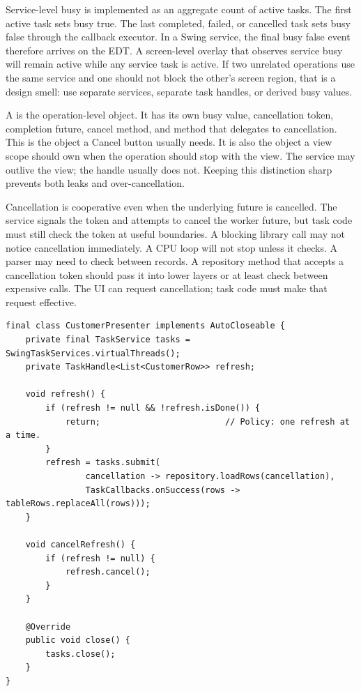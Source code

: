 Service-level busy is implemented as an aggregate count of active tasks. The
first active task sets busy true. The last completed, failed, or cancelled task
sets busy false through the callback executor. In a Swing service, the final
busy false event therefore arrives on the EDT. A screen-level overlay that
observes service busy will remain active while any service task is active. If
two unrelated operations use the same service and one should not block the
other's screen region, that is a design smell: use separate services, separate
task handles, or derived busy values.

A  is the operation-level object. It has its own busy value,
cancellation token, completion future, cancel method, and  method
that delegates to cancellation. This is the object a Cancel button usually
needs. It is also the object a view scope should own when the operation should
stop with the view. The service may outlive the view; the handle usually does
not. Keeping this distinction sharp prevents both leaks and over-cancellation.

Cancellation is cooperative even when the underlying future is cancelled. The
service signals the token and attempts to cancel the worker future, but task
code must still check the token at useful boundaries. A blocking library call
may not notice cancellation immediately. A CPU loop will not stop unless it
checks. A parser may need to check between records. A repository method that
accepts a cancellation token should pass it into lower layers or at least check
between expensive calls. The UI can request cancellation; task code must make
that request effective.

\begin{lstlisting}[caption={A task service registered with a view lifecycle.}]
final class CustomerPresenter implements AutoCloseable {
    private final TaskService tasks = SwingTaskServices.virtualThreads();
    private TaskHandle<List<CustomerRow>> refresh;

    void refresh() {
        if (refresh != null && !refresh.isDone()) {
            return;                         // Policy: one refresh at a time.
        }
        refresh = tasks.submit(
                cancellation -> repository.loadRows(cancellation),
                TaskCallbacks.onSuccess(rows -> tableRows.replaceAll(rows)));
    }

    void cancelRefresh() {
        if (refresh != null) {
            refresh.cancel();
        }
    }

    @Override
    public void close() {
        tasks.close();
    }
}
\end{lstlisting}


